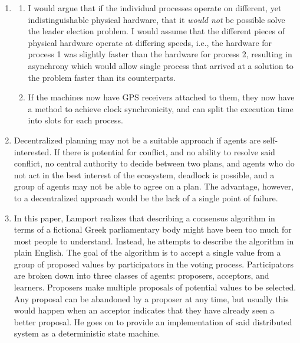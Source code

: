 \documentclass{article}
\begin{document}
\begin{enumerate}
\item{} %
\begin{enumerate}
\item{} %

I would argue that if the individual processes operate on different, yet indistinguishable physical hardware, that it \emph{would not} be possible solve the leader election problem. I would assume that the different pieces of physical hardware operate at differing speeds, i.e., the hardware for process 1 was slightly faster than the hardware for process 2, resulting in asynchrony which would allow single process that arrived at a solution to the problem faster than its counterparts.

\item{} %

If the machines now have GPS receivers attached to them, they now have a method to achieve clock synchronicity, and can split the execution time into slots for each process.

\end{enumerate}

\item{} %

Decentralized planning may not be a suitable approach if agents are self-interested. If there is potential for conflict, and no ability to resolve said conflict, no central authority to decide between two plans, and agents who do not act in the best interest of the ecosystem, deadlock is possible, and a group of agents may not be able to agree on a plan. The advantage, however, to a decentralized approach would be the lack of a single point of failure.

\item{} %

In this paper, Lamport realizes that describing a consensus algorithm in terms of a fictional Greek parliamentary body might have been too much for most people to understand. Instead, he attempts to describe the algorithm in plain English. The goal of the algorithm is to accept a single value from a group of proposed values by participators in the voting process. Participators are broken down into three classes of agents: proposers, acceptors, and learners. Proposers make multiple proposals of potential values to be selected. Any proposal can be abandoned by a proposer at any time, but usually this would happen when an acceptor indicates that they have already seen a better proposal. He goes on to provide an implementation of said distributed system as a deterministic state machine.


\end{enumerate}
\end{document}
